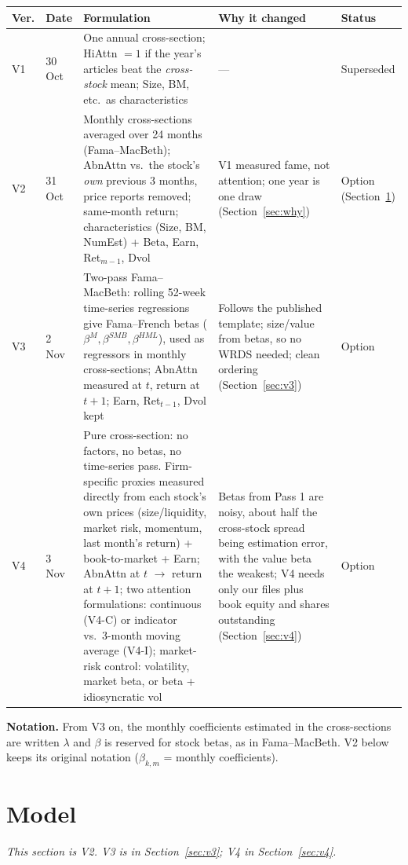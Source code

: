 \documentclass[11pt]{article}
\begin{document}
\begin{center}\small
\begin{tabularx}{\textwidth}{p{0.7cm} p{1.6cm} >{\raggedright}X >{\raggedright}p{3.3cm} p{1.9cm}}
\toprule
Ver. & Date & Formulation & Why it changed & Status\\
\midrule
V1 & 30 Oct & One annual cross-section; HiAttn $=1$ if the year's articles beat the \emph{cross-stock} mean; Size, BM, etc.\ as characteristics & --- & Superseded\\
\addlinespace
V2 & 31 Oct & Monthly cross-sections averaged over 24 months (Fama--MacBeth); AbnAttn vs.\ the stock's \emph{own} previous 3 months, price reports removed; same-month return; characteristics (Size, BM, NumEst) + Beta, Earn, Ret$_{m-1}$, Dvol & V1 measured fame, not attention; one year is one draw (Section~\ref{sec:why}) & Option (Section~\ref{sec:model})\\
\addlinespace
V3 & 2 Nov & Two-pass Fama--MacBeth: rolling 52-week time-series regressions give Fama--French betas ($\beta^M,\beta^{SMB},\beta^{HML}$), used as regressors in monthly cross-sections; AbnAttn measured at $t$, return at $t+1$; Earn, Ret$_{t-1}$, Dvol kept & Follows the published template; size/value from betas, so no WRDS needed; clean ordering (Section~\ref{sec:v3}) & Option\\
\addlinespace
V4 & 3 Nov & Pure cross-section: no factors, no betas, no time-series pass. Firm-specific proxies measured directly from each stock's own prices (size/liquidity, market risk, momentum, last month's return) + book-to-market + Earn; AbnAttn at $t$ $\rightarrow$ return at $t+1$; two attention formulations: continuous (V4-C) or indicator vs.\ 3-month moving average (V4-I); market-risk control: volatility, market beta, or beta + idiosyncratic vol & Betas from Pass 1 are noisy, about half the cross-stock spread being estimation error, with the value beta the weakest; V4 needs only our files plus book equity and shares outstanding (Section~\ref{sec:v4}) & Option\\
\bottomrule
\end{tabularx}
\end{center}

\textbf{Notation.} From V3 on, the monthly coefficients estimated in the cross-sections are written $\lambda$ and $\beta$ is reserved for stock betas, as in Fama--MacBeth. V2 below keeps its original notation ($\beta_{k,m}$ = monthly coefficients).

\section{Model}\label{sec:model}
\textit{This section is V2. V3 is in Section~\ref{sec:v3}; V4 in Section~\ref{sec:v4}.}
\end{document}
